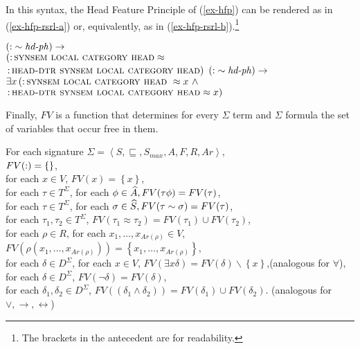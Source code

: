 \documentclass[output=paper
                ,modfonts
                ,nonflat
	        ,collection
	        ,collectionchapter
	        ,collectiontoclongg
 	        ,biblatex
                ,babelshorthands
                ,newtxmath
                ,draftmode
                ,colorlinks, citecolor=brown
]{./langsci/langscibook}
\begin{document}
{{In this syntax, the Head Feature Principle of (\ref{ex-hfp}) can be
rendered as in (\ref{ex-hfp-rsrl-a}) or, equivalently, as in
(\ref{ex-hfp-rsrl-b}).\footnote{The brackets in the antecedent are
for readability.}

\begin{exe}
  \ex
  \begin{xlist}
  \ex\label{ex-hfp-rsrl-a}
  $\left(\operatorname{:}\sim\mbox{{\normalfont\itshape hd-ph\/}}\right)\rightarrow$\\ %
  $\left(\operatorname{:}\textsc{synsem local category head}\approx\right.$\\
 \hspace*{.1em} $\left.\operatorname{:}\textsc{head-dtr synsem local category head}\right)$
  \ex\label{ex-hfp-rsrl-b}
   $\left(\operatorname{:}\sim\mbox{{\normalfont\itshape hd-ph\/}}\right)\rightarrow$\\ %
  $\exists x\left(\operatorname{:}\textsc{synsem local category head}~\approx x\ \wedge\right.$\\
\hspace*{1.2em}  $\left.\operatorname{:}\textsc{head-dtr synsem local category head}\approx x\right)$
  \end{xlist}
\end{exe}

Finally, $FV$ is a function that determines for every $\Sigma$ term and
$\Sigma$ formula the set of variables that occur free in them.

\begin{mydef}
  For each signature $\Sigma=\left<S,\sqsubseteq,S_{max},A,F,R,Ar\right>$,\\
  $FV(\operatorname{:})=\left\{\right\}$,\\
  for each $x\in V$, $FV(x)=\left\{x\right\}$,\\
  for each $\tau\in T^{\Sigma}$, for each $\phi\in\widehat{A}, FV(\tau\phi)=FV(\tau)$,\\
  for each $\tau\in T^{\Sigma}$, for each $\sigma\in\widehat{S}, FV(\tau\sim\sigma)=FV(\tau)$,\\
  for each $\tau_1, \tau_2\in T^{\Sigma}$, $FV(\tau_1\approx\tau_2)=FV(\tau_1)\cup FV(\tau_2)$,\\
  for each $\rho\in R$, for each $x_1,\ldots, x_{Ar(\rho)}\in V$,
  $FV(\rho(x_1,\ldots, x_{Ar(\rho)}))=\left\{x_1,\ldots, x_{Ar(\rho)}\right\}$,\\
  for each $\delta\in D^{\Sigma}$, for each $x\in V$,
  $FV(\exists x\delta)=FV(\delta)\backslash\left\{x \right\}$,\hfill(analogous for $\forall$),\\
  for each $\delta\in D^{\Sigma}$, $FV(\neg\delta)=FV(\delta)$,\\
  for each $\delta_1,\delta_2\in D^{\Sigma}$,
  $FV((\delta_1\land\delta_2))=FV(\delta_1)\cup FV(\delta_2)$.
  \hfill (analogous for $\lor,\rightarrow,\leftrightarrow$)
\end{mydef}

}}
\end{document}
